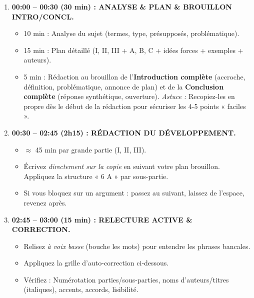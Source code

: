 \documentclass[11pt]{article}
\begin{document}
\begin{methode}
\begin{enumerate}
    \item \textbf{00:00 -- 00:30 (30 min) : ANALYSE \& PLAN \& BROUILLON INTRO/CONCL.}
    \begin{itemize}
        \item 10 min : Analyse du sujet (termes, type, présupposés, problématique).
        \item 15 min : Plan détaillé (I, II, III + A, B, C + idées forces + exemples + auteurs).
        \item 5 min : Rédaction au brouillon de l'\textbf{Introduction complète} (accroche, définition, problématique, annonce de plan) et de la \textbf{Conclusion complète} (réponse synthétique, ouverture). \emph{Astuce :} Recopiez-les en propre dès le début de la rédaction pour sécuriser les 4-5 points « faciles ».
    \end{itemize}
    \item \textbf{00:30 -- 02:45 (2h15) : RÉDACTION DU DÉVELOPPEMENT.}
    \begin{itemize}
        \item $\approx$ 45 min par grande partie (I, II, III).
        \item Écrivez \emph{directement sur la copie} en suivant votre plan brouillon. Appliquez la structure « 6 A » par sous-partie.
        \item Si vous bloquez sur un argument : passez au suivant, laissez de l'espace, revenez après.
    \end{itemize}
    \item \textbf{02:45 -- 03:00 (15 min) : RELECTURE ACTIVE \& CORRECTION.}
    \begin{itemize}
        \item Relisez \emph{à voix basse} (bouche les mots) pour entendre les phrases bancales.
        \item Appliquez la grille d'auto-correction ci-dessous.
        \item Vérifiez : Numérotation parties/sous-parties, noms d'auteurs/titres (italiques), accents, accords, lisibilité.
    \end{itemize}
\end{enumerate}
\end{methode}
\end{document}
